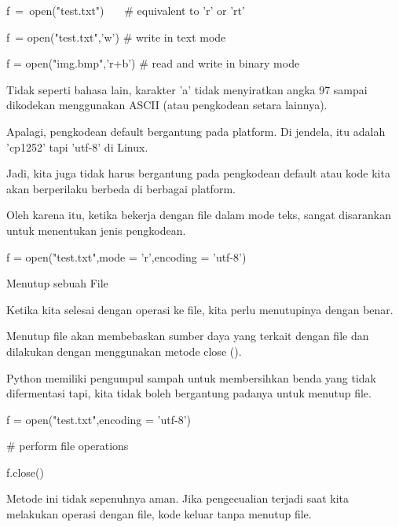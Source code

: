 \vspace{12pt}
f~=~open("test.txt")~~~    $  \#  $ equivalent to 'r' or 'rt' \par
f~= open("test.txt",'w')   $  \#  $ write in text mode \par
f = open("img.bmp",'r+b')  $  \#  $ read and write in binary mode \par
\vspace{12pt}
Tidak seperti bahasa lain, karakter 'a' tidak menyiratkan angka 97 sampai dikodekan menggunakan ASCII (atau pengkodean setara lainnya). \par
\vspace{12pt}
Apalagi, pengkodean default bergantung pada platform. Di jendela, itu adalah 'cp1252' tapi 'utf-8' di Linux. \par
\vspace{12pt}
Jadi, kita juga tidak harus bergantung pada pengkodean default atau kode kita akan berperilaku berbeda di berbagai platform. \par
\vspace{12pt}
Oleh karena itu, ketika bekerja dengan file dalam mode teks, sangat disarankan untuk menentukan jenis pengkodean. \par
\vspace{12pt}
f = open("test.txt",mode = 'r',encoding = 'utf-8') \par
\vspace{12pt}
Menutup sebuah File \par
\vspace{12pt}
Ketika kita selesai dengan operasi ke file, kita perlu menutupinya dengan benar. \par
\vspace{12pt}
Menutup file akan membebaskan sumber daya yang terkait dengan file dan dilakukan dengan menggunakan metode close (). \par
\vspace{12pt}
Python memiliki pengumpul sampah untuk membersihkan benda yang tidak difermentasi tapi, kita tidak boleh bergantung padanya untuk menutup file. \par
f = open("test.txt",encoding = 'utf-8') \par
 $  \#  $ perform file operations \par
f.close() \par
\vspace{12pt}
Metode ini tidak sepenuhnya aman. Jika pengecualian terjadi saat kita melakukan operasi dengan file, kode keluar tanpa menutup file. \par
